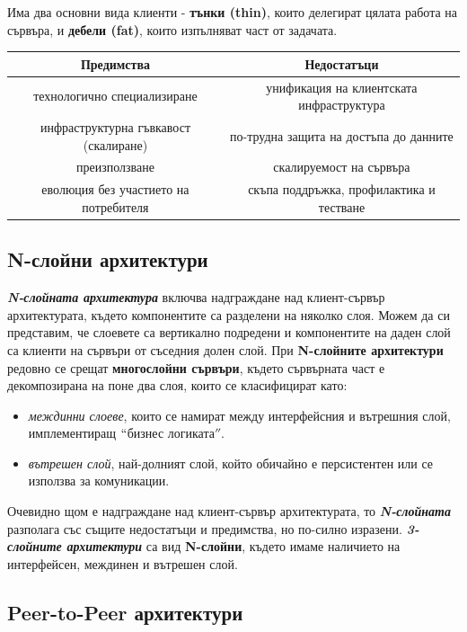 \documentclass[fleqn,12pt]{article}
\begin{document}
Има два основни вида клиенти - \textbf{тънки (thin)}, които делегират цялата работа на сървъра, и \textbf{дебели (fat)}, които изпълняват част от задачата.
\bigbreak


\begin{center}
\begin{tabular}{ |c|c| } 
    \hline
    Предимства & Недостатъци \\
    \hline
    технологично специализиране & унификация на клиентската инфраструктура \\
    \hline
    инфраструктурна гъвкавост (скалиране) & по-трудна защита на достъпа до данните \\
    \hline
    преизползване & скалируемост на сървъра \\
    \hline
    еволюция без участието на потребителя & скъпа поддръжка, профилактика и тестване \\
    \hline
\end{tabular}
\end{center}

\subsection{N-слойни архитектури}

\textbf{\textit{N-слойната архитектура}} включва надграждане над клиент-сървър архитектурата, където компонентите са разделени на няколко слоя.
Можем да си представим, че слоевете са вертикално подредени и компонентите на даден слой са клиенти на сървъри от съседния долен слой.
\bigbreak
При \textbf{N-слойните архитектури} редовно се срещат \textbf{многослойни сървъри}, където сървърната част е декомпозирана на поне два слоя, които се класифицират като:
\begin{itemize}
    \item \textit{междинни слоеве}, които се намират между интерфейсния и вътрешния слой, имплементиращ $``$бизнес логиката$''$.
    \item \textit{вътрешен слой}, най-долният слой, който обичайно е персистентен или се използва за комуникации. 
\end{itemize}

Очевидно щом е надграждане над клиент-сървър архитектурата, то \textbf{\textit{N-слойната}} разполага със същите недостатъци и предимства, но по-силно изразени.
\bigbreak
\textbf{\textit{3-слойните архитектури}} са вид \textbf{N-слойни}, където имаме наличието на интерфейсен, междинен и вътрешен слой.

\subsection{Peer-to-Peer архитектури}
\end{document}

